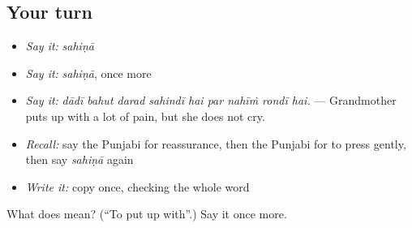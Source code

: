 \subsection*{Your turn}
\begin{itemize}
\raggedright
  \item \emph{Say it:} \emph{sahiṇā}
  \item \emph{Say it:} \emph{sahiṇā}, once more
  \item \emph{Say it:} \emph{dādī bahut darad sahindī hai par nahīṁ rondī hai.} — Grandmother puts up with a lot of pain, but she does not cry.
  \item \emph{Recall:} say the Punjabi for reassurance, then the Punjabi for to press gently, then say \emph{sahiṇā} again
  \item \emph{Write it:} copy \textbf{} once, checking the whole word
\end{itemize}

\begin{tcolorbox}[breakable,colback=teal!4,colframe=teal!35!black,title={Before you move on}]
What does  mean? (\textquotedblleft{}To put up with\textquotedblright{}.) Say it once more.
\end{tcolorbox}
